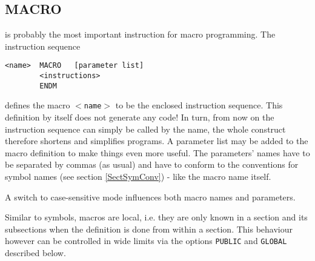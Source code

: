\documentclass[12pt,twoside]{report}
\makeatletter
\newcommand{\tty}[1]{{\tt #1}}
\newcommand{\ttindex}[1]{\index{#1@{\tt #1}}}
\makeatother
\begin{document}

\subsection{MACRO}
\ttindex{MACRO}\ttindex{ENDM}

is probably the most important instruction for macro programming. 
The instruction sequence
\begin{verbatim}
<name>  MACRO   [parameter list]
        <instructions>
        ENDM
\end{verbatim}
defines the macro \tty{$<$name$>$} to be the enclosed instruction sequence. 
This definition by itself does not generate any code!  In turn, from
now on the instruction sequence can simply be called by the name, the
whole construct therefore shortens and simplifies programs.  A
parameter list may be added to the macro definition to make things
even more useful.  The parameters' names have to be separated by
commas (as usual) and have to conform to the conventions for symbol
names (see section \ref{SectSymConv}) - like the macro name itself.

A switch to case-sensitive mode influences both macro names and
parameters.

Similar to symbols, macros are local, i.e. they are only known in a
section and its subsections when the definition is done from within
a section.  This behaviour however can be controlled in wide limits
via the options \tty{PUBLIC} and \tty{GLOBAL} described below.
\end{document}
